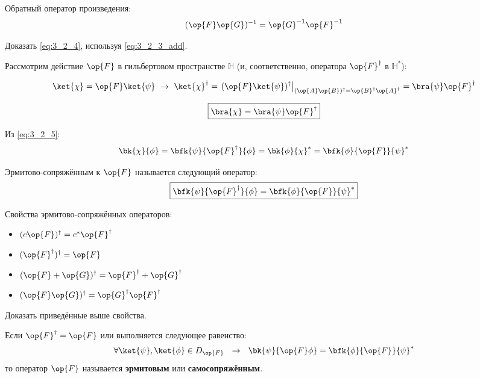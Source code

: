 Обратный оператор произведения:
\begin{equation}
\label{eq:3_2_4}
(\op{F}\op{G})^{-1} = \op{G}^{-1} \op{F}^{-1}
\end{equation}

\begin{excr}
Доказать \eqref{eq:3_2_4}, используя \eqref{eq:3_2_3_add}.
\end{excr}

Рассмотрим действие $\op{F}$ в гильбертовом пространстве $\mathbb{H}$ (и, соответственно, оператора $\op{F}^\dag$ в $\mathbb{H}^*$):

$$
\ket{\chi} = \op{F}\ket{\psi} ~\to~ \ket{\chi}^\dag = \left. (\op{F}\ket{\psi})^\dag \right|_{(\op{A}\op{B})^\dag = \op{B}^\dag \op{A}^\dag} = \bra{\psi} \op{F}^\dag
$$

\begin{equation}
\label{eq:3_2_5}
\boxed{
	\bra{\chi} = \bra{\psi} \op{F}^\dag
}
\end{equation}

Из \eqref{eq:3_2_5}:
$$
\bk{\chi}{\phi} = \bfk{\psi}{\op{F}^\dag}{\phi} = \bk{\phi}{\chi}^* = \bfk{\phi}{\op{F}}{\psi}^*
$$

\begin{defn}
Эрмитово-сопряжённым к $\op{F}$ называется следующий оператор:
\begin{equation}
\label{eq:3_2_6}
\boxed{
	\bfk{\psi}{\op{F}^\dag}{\phi} = \bfk{\phi}{\op{F}}{\psi}^*
}
\end{equation}
\end{defn}

Свойства эрмитово-сопряжённых операторов:
\begin{itemize}
\item $(c\op{F})^\dag = c^* \op{F}^\dag$
\item $(\op{F}^\dag)^\dag = \op{F}$
\item $(\op{F} + \op{G})^\dag = \op{F}^\dag + \op{G}^\dag$
\item $(\op{F}\op{G})^\dag = \op{G}^\dag \op{F}^\dag$
\end{itemize}

\begin{excr}
Доказать приведённые выше свойства.
\end{excr}

\begin{defn}
Если $\op{F}^\dag = \op{F}$ или выполняется следующее равенство:
\begin{equation}
\label{eq:3_2_7}
\forall \ket{\psi},\ket{\phi} \in D_{\op{F}} ~~\to~~  \bk{\psi}{\op{F}\phi} = \bfk{\phi}{\op{F}}{\psi}^*
\end{equation}
то оператор $\op{F}$ называется \textbf{эрмитовым} или \textbf{самосопряжённым}.
\end{defn}

